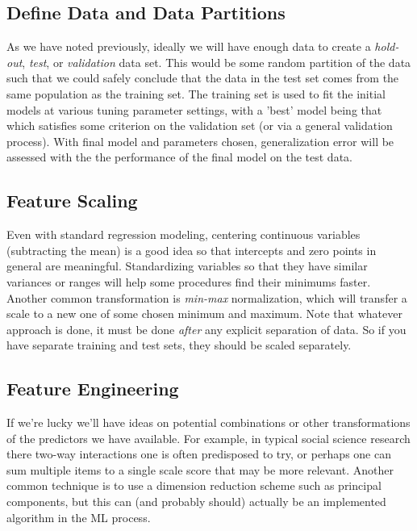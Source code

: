 \documentclass[english,nohyper,titlepage]{tufte-handout}
\begin{document}
\subsection{Define Data and Data Partitions}
As we have noted previously, ideally we will have enough data to create a \emph{hold-out}, \emph{test}, or \emph{validation} data set. This would be some random partition of the data such that we could safely conclude that the data in the test set comes from the same population as the training set. The training set is used to fit the initial models at various tuning parameter settings, with a 'best' model being that which satisfies some criterion on the validation set (or via a general validation process).  With final model and parameters chosen, generalization error will be assessed with the the performance of the final model on the test data.

\subsection{Feature Scaling}
Even with standard regression modeling, centering continuous variables (subtracting the mean) is a good idea so that intercepts and zero points in general are meaningful. Standardizing variables so that they have similar variances or ranges will help some procedures find their minimums faster.  Another common transformation is \emph{min-max} normalization, which will transfer a scale to a new one of some chosen minimum and maximum.  Note that whatever approach is done, it must be done \emph{after} any explicit separation of data.  So if you have separate training and test sets, they should be scaled separately.

\subsection{Feature Engineering}
If we're lucky we'll have ideas on potential combinations or other transformations of the predictors we have available.  For example, in typical social science research there two-way interactions one is often predisposed to try, or perhaps one can sum multiple items to a single scale score that may be more relevant.  Another common technique is to use a dimension reduction scheme such as principal components, but this can (and probably should) actually be an implemented algorithm in the ML process.
\end{document}
